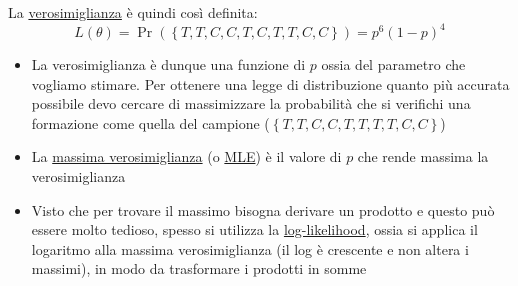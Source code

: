 La \underline{verosimiglianza} è quindi così definita:
\[
	L\left(\theta \right) = \Pr \left(\left\{T,T,C,C,T,C,T,T,C,C\right\}\right) = p^{6} \left(1-p\right)^{4}
\]
\begin{itemize}
	\item La verosimiglianza è dunque una funzione di $ p $ ossia del parametro che vogliamo stimare. Per ottenere una legge di distribuzione quanto più accurata possibile devo cercare di massimizzare la probabilità che si verifichi una formazione come quella del campione ($ \left\{T,T,C,C,T,T,T,T,C,C\right\} $)
	\item La \underline{massima verosimiglianza} (o \underline{MLE}) è il valore di $ p $ che rende massima la verosimiglianza
	\item Visto che per trovare il massimo bisogna derivare un prodotto e questo può essere molto tedioso, spesso si utilizza la \underline{log-likelihood}, ossia si applica il logaritmo alla massima verosimiglianza (il log è crescente e non altera i massimi), in modo da trasformare i prodotti in somme
\end{itemize}
